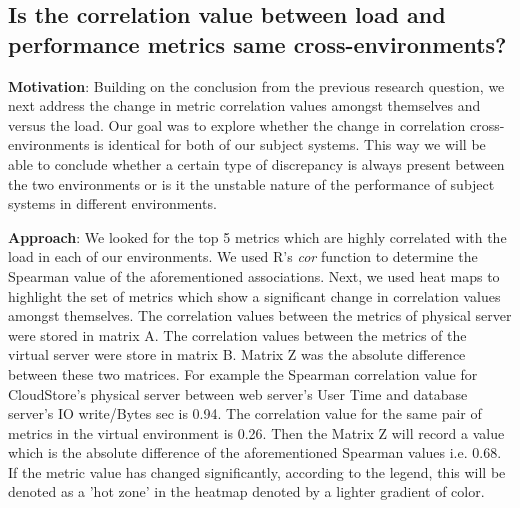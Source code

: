 \subsection{\textbf{Is the correlation value between load and performance metrics same cross-environments?}}

\textbf{Motivation}: Building on the conclusion from the previous research question, we next address the change in metric correlation values amongst themselves and versus the load. Our goal was to explore whether the change in correlation cross-environments is identical for both of our subject systems. This way we will be able to conclude whether a certain type of discrepancy is always present between the two environments or is it the unstable nature of the performance of subject systems in different environments. 




\textbf{Approach}: We looked for the top 5 metrics which are highly correlated with the load in each of our environments. We used R's \textit{cor} function to determine the Spearman value of the aforementioned associations. 
Next, we used heat maps to highlight the set of metrics which show a significant change in correlation values amongst themselves.
The correlation values between the metrics of physical server were stored in matrix A. The correlation values between the metrics of the virtual server were store in matrix B. Matrix Z was the absolute difference between these two matrices. For example the Spearman correlation value for CloudStore's physical server between web server's User Time and database server's IO write/Bytes sec is 0.94. The correlation value for the same pair of metrics in the virtual environment is 0.26. Then the Matrix Z will record a value which is the absolute difference of the aforementioned Spearman values i.e. 0.68. If the metric value has changed significantly, according to the legend, this will be denoted as a 'hot zone' in the heatmap denoted by a lighter gradient of color.

